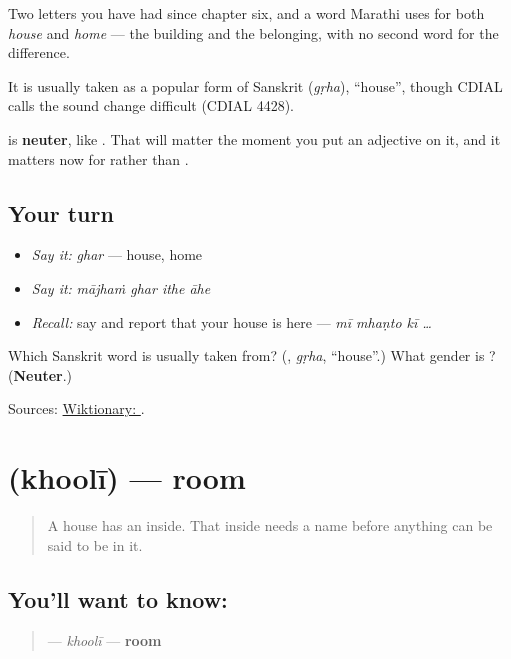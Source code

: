 Two letters you have had since chapter six, and a word Marathi uses for both \emph{house} and \emph{home} — the building and the belonging, with no second word for the difference.

It is usually taken as a popular form of Sanskrit \textbf{} (\emph{gṛha}), \textquotedblleft{}house\textquotedblright{}, though CDIAL calls the sound change difficult (CDIAL 4428).

\textbf{} is \textbf{neuter}, like \textbf{}. That will matter the moment you put an adjective on it, and it matters now for \textbf{} rather than \emph{}.

\subsection*{Your turn}
\begin{itemize}
\raggedright
  \item \emph{Say it:} \emph{ghar} — house, home
  \item \emph{Say it:} \emph{mājhaṁ ghar ithe āhe}
  \item \emph{Recall:} say \textbf{} and report that your house is here — \emph{mī mhaṇto kī …}
\end{itemize}

\begin{tcolorbox}[breakable,colback=teal!4,colframe=teal!35!black,title={Before you move on}]
Which Sanskrit word is \textbf{} usually taken from? (\textbf{}, \emph{gṛha}, \textquotedblleft{}house\textquotedblright{}.) What gender is \textbf{}? (\textbf{Neuter}.)

Sources: \href{https://en.wiktionary.org/wiki/\%E0\%A4\%98\%E0\%A4\%B0}{Wiktionary: }.
\end{tcolorbox}
\section[\texorpdfstring{\mr{खोली} (khoolī)}{खोली (khoolī)}]{ (khoolī) — room}

\label{lesson:MR-C41-kholi}



\begin{quote}
A house has an inside. That inside needs a name before anything can be said to be in it.
\end{quote}

\subsection*{You'll want to know: }
\begin{quote}
\textbf{} — \emph{khoolī} — \textbf{room}
\end{quote}

